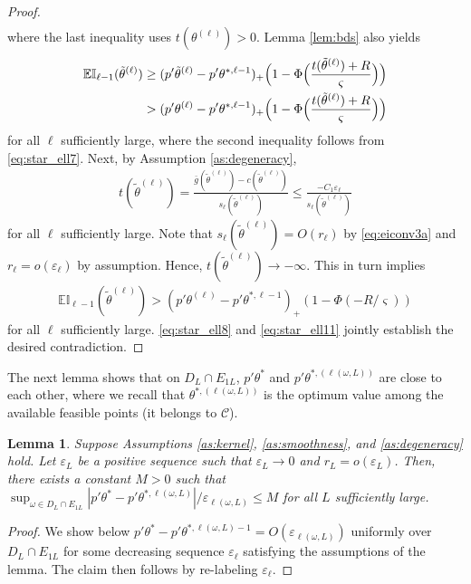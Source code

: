 \documentclass[letterpaper,11pt]{article}
\theoremstyle{myplain}
\newtheorem{lemma}{Lemma}[section]
\theoremstyle{mydefinition}
\theoremstyle{myremark}
\newcommand{\cC}{\mathcal{C}}
\numberwithin{equation}{section}
\numberwithin{figure}{section}
\begin{document}
\begin{appendix}
\begin{proof}
\begin{align}
\end{align}
where the last inequality uses $t(\theta^{(\ell)})>0$. Lemma \ref{lem:bds} also yields
\begin{align}
\mathbb{EI}_{\ell-1}(\tilde\theta^{(\ell)})&\ge (p'\tilde\theta^{(\ell)}-p'\theta^{*,\ell-1})_+\Bigl(1-\Phi\Bigl(\frac{t(\tilde \theta^{(\ell)})+R}{\varsigma}\Bigr)\Bigr)\notag\\
&> (p'\theta^{(\ell)}-p'\theta^{*,\ell-1})_+\Bigl(1-\Phi\Bigl(\frac{t(\tilde \theta^{(\ell)})+R}{\varsigma}\Bigr)\Bigr)\label{eq:star_ell9}
\end{align}
for all $\ell$ sufficiently large, where the second inequality follows from \eqref{eq:star_ell7}. Next, by Assumption \ref{as:degeneracy},
\begin{align}
t(\tilde \theta^{(\ell)})=\frac{\bar g(\tilde\theta^{(\ell)})-c(\tilde\theta^{(\ell)})}{s_\ell(\tilde\theta^{(\ell)})}\le \frac{-C_1\varepsilon_\ell}{s_\ell(\tilde\theta^{(\ell)})}\label{eq:star_ell10}
\end{align}
for all $\ell$ sufficiently large.
Note that  $s_\ell(\tilde\theta^{(\ell)})=O(r_\ell)$ by \eqref{eq:eiconv3a} and $r_\ell=o(\varepsilon_\ell)$ by assumption. Hence,  $t(\tilde \theta^{(\ell)})\to -\infty$.
This in turn implies
\begin{align}
\mathbb{EI}_{\ell-1}(\tilde\theta^{(\ell)})> (p'\theta^{(\ell)}-p'\theta^{*,\ell-1})_+(1-\Phi(-R/\varsigma))\label{eq:star_ell11}
\end{align}
for all $\ell$ sufficiently large. \eqref{eq:star_ell8} and \eqref{eq:star_ell11} jointly establish the desired contradiction.
\end{proof}

The next lemma shows that on $D_L\cap E_{1L}$, $p'\theta^*$ and $p'\theta^{*,(\ell(\omega,L))}$ are close to each other, where we recall that $\theta^{*,(\ell(\omega,L))}$ is the optimum value among the available feasible points (it belongs to $\cC$).
\begin{lemma}\label{lem:star-current}
  Suppose Assumptions \ref{as:kernel}, \ref{as:smoothness}, and \ref{as:degeneracy} hold.	Let $\varepsilon_L$ be a positive sequence such that $\varepsilon_L\to 0$ and $r_L=o(\varepsilon_L)$.
  Then, there exists a constant $M>0$ such that $\sup_{\omega\in D_L\cap E_{1L}}|p'\theta^*-p'\theta^{*,\ell(\omega,L)}|/\varepsilon_{\ell(\omega,L)}\le M$ for all $L$ sufficiently large.
\end{lemma}


\begin{proof}
We show below $p'\theta^*-p'\theta^{*,\ell(\omega,L)-1}=O(\varepsilon_{\ell(\omega,L)})$ uniformly over $D_L\cap E_{1L}$ for some decreasing sequence $\varepsilon_\ell$ satisfying the assumptions of the lemma. The claim then follows by re-labeling $\varepsilon_\ell$.


\end{proof}
\end{appendix}
\end{document}
